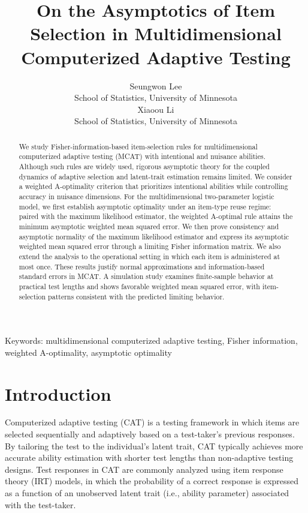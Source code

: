 \documentclass[12pt]{article}
\begin{document}
\title{On the Asymptotics of Item Selection in Multidimensional Computerized Adaptive Testing}
\author{
  Seungwon Lee\\
  School of Statistics, University of Minnesota\vspace{0.5cm}\\
  Xiaoou Li\\
  School of Statistics, University of Minnesota}
\date{}
\maketitle

\onehalfspacing
\begin{abstract}
We study Fisher-information-based item-selection rules for multidimensional computerized adaptive testing (MCAT) with intentional and nuisance abilities. Although such rules are widely used, rigorous asymptotic theory for the coupled dynamics of adaptive selection and latent-trait estimation remains limited. We consider a weighted A-optimality criterion that prioritizes intentional abilities while controlling accuracy in nuisance dimensions. For the multidimensional two-parameter logistic model, we first establish asymptotic optimality under an item-type reuse regime: paired with the maximum likelihood estimator, the weighted A-optimal rule attains the minimum asymptotic weighted mean squared error. We then prove consistency and asymptotic normality of the maximum likelihood estimator and express its asymptotic weighted mean squared error through a limiting Fisher information matrix. We also extend the analysis to the operational setting in which each item is administered at most once. These results justify normal approximations and information-based standard errors in MCAT. A simulation study examines finite-sample behavior at practical test lengths and shows favorable weighted mean squared error, with item-selection patterns consistent with the predicted limiting behavior.
\end{abstract}

\noindent
Keywords:
{multidimensional computerized adaptive testing},
{Fisher information},
{weighted A-optimality},
{asymptotic optimality}

\section{Introduction}
Computerized adaptive testing (CAT) is a testing framework in which items are selected sequentially and adaptively based on a test-taker’s previous responses. By tailoring the test to the individual’s latent trait, CAT typically achieves more accurate ability estimation with shorter test lengths than non-adaptive testing designs. Test responses in CAT are commonly analyzed using item response theory (IRT) models, in which the probability of a correct response is expressed as a function of an unobserved latent trait (i.e., ability parameter) associated with the test-taker.
\end{document}
